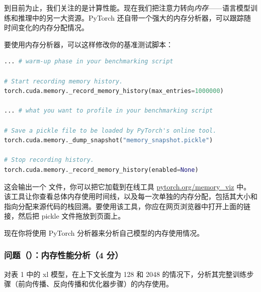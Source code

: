 到目前为止，我们关注的是计算性能。现在我们把注意力转向\emph{内存}——语言模型训练和推理中的另一大资源。PyTorch 还自带一个强大的内存分析器，可以跟踪随时间变化的内存分配情况。

要使用内存分析器，可以这样修改你的基准测试脚本：

\begin{lstlisting}[language=Python]
... # warm-up phase in your benchmarking script

# Start recording memory history.
torch.cuda.memory._record_memory_history(max_entries=1000000)

... # what you want to profile in your benchmarking script

# Save a pickle file to be loaded by PyTorch's online tool.
torch.cuda.memory._dump_snapshot("memory_snapshot.pickle")

# Stop recording history.
torch.cuda.memory._record_memory_history(enabled=None)
\end{lstlisting}

这会输出一个  文件，你可以把它加载到在线工具 \url{pytorch.org/memory_viz} 中。该工具让你查看总体内存使用时间线，以及每一次单独的内存分配，包括其大小和指向分配来源代码的栈回溯。要使用该工具，你应在网页浏览器中打开上面的链接，然后把 pickle 文件拖放到页面上。

现在你将使用 PyTorch 分析器来分析自己模型的内存使用情况。

\subsubsection*{问题（）：内存性能分析（4 分）}

对表 1 中的 xl 模型，在上下文长度为 128 和 2048 的情况下，分析其完整训练步骤（前向传播、反向传播和优化器步骤）的内存使用。

